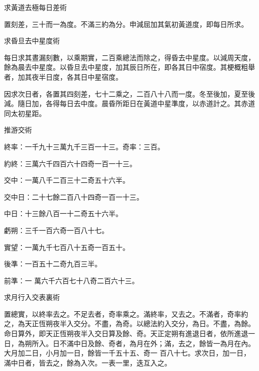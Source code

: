 \begin{pinyinscope}
 求黃道去極每日差術



 置刻差，三十而一為度。不滿三約為分。申減屈加其氣初黃道度，即每日所求。



 求昏旦去中星度術



 每日求其晝漏刻數，以乘期實，二百乘總法而除之，得昏去中星度。以減周天度，餘為晨去中星度。以昏旦去中星度，加其辰日所在，即各其日中宿度。其梗概粗舉者，加其夜半日度，各其日中星宿度。



 因求次日者，各置其四刻差，七十二乘之，二百八十八而一度。冬至後加，夏至後減。隨日加，各得每日去中度。晨昏所距日在黃道中星準度，以赤道計之。其赤道同太初星距。



 推游交術



 終率：一千九十三萬九千三百一十三。奇率：三百。



 約終：三萬六千四百六十四奇一百一十三。



 交中：一萬八千二百三十二奇五十六半。



 交中日：二十七餘二百八十四奇一百一十三。



 中日：十三餘八百一十二奇五十六半。



 虧朔：三千一百六奇一百八十七。



 實望：一萬九千七百八十五奇一百五十。



 後準：一百五十二奇九百三半。



 前準：一
 萬六千六百七十八奇二百六十三。



 求月行入交表裏術



 置總實，以終率去之。不足去者，奇率乘之。滿終率，又去之。不滿者，奇率約之，為天正恆朔夜半入交分。不盡，為奇。以總法約入交分，為日。不盡，為餘。命日算外，即天正恆朔夜半入交日算及餘、奇。天正定朔有進退日者，依所進退一日，為朔所入。日不滿中日及餘、奇者，為月在外；滿，去之，餘皆一為月在內。大月加二日，小月加一日，餘皆一千五十五、奇一
 百八十七。求次日，加一日，滿中日者，皆去之，餘為入次。一表一里，迭互入之。




\end{pinyinscope}
